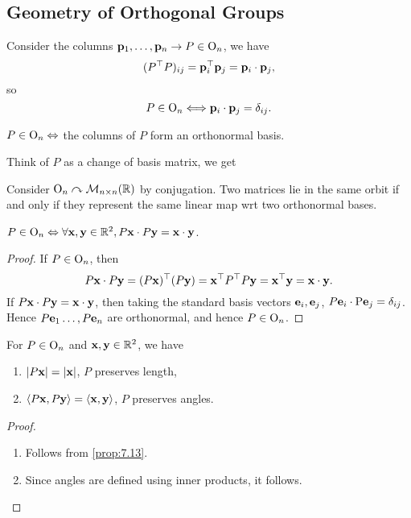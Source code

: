 \documentclass[10pt]{article}
\def\P{{\mathrm P}}
\begin{document}
    \subsection{Geometry of Orthogonal Groups}
    Consider the columns $ {\bf p}_1,\dots,{\bf p}_n\to P\in \mathrm{O}_n $, we have 
    \[
        (P^\top P)_{ij} = {\bf p}_i^\top{\bf p}_j = {\bf p}_i \cdot {\bf p}_j,
    \]
    so
    \[
        P\in \mathrm{O}_n \Longleftrightarrow {\bf p}_i \cdot {\bf p}_j = \delta_{ij}.
    \]
    \begin{proposition}\label{prop:7.11}
        $ P\in \mathrm{O}_n \Leftrightarrow  $ the columns of $P$ form an orthonormal basis.
    \end{proposition}
    Think of $P$ as a change of basis matrix, we get 
    \begin{proposition}\label{prop:7.12}
        Consider $ \mathrm{O}_n \curvearrowright \mathcal{M}_{n\times n}(\mathbb{R}) $ by conjugation. Two matrices lie in the same orbit if and only if they represent the same linear map wrt two orthonormal bases.
    \end{proposition}
    \begin{proposition}\label{prop:7.13}
        $ P\in \mathrm{O}_n \Leftrightarrow \forall {\bf x},{\bf y}\in \mathbb{R}^{2}, P{\bf x} \cdot P{\bf y} = {\bf x} \cdot {\bf y} $.
    \end{proposition}
    \begin{proof}
        If $ P\in \mathrm{O}_n $, then 
        \[
            P{\bf x} \cdot P{\bf y} = (P{\bf x})^\top(P{\bf y}) = {\bf x}^\top P^\top P {\bf y} = {\bf x}^\top {\bf y} = {\bf x} \cdot {\bf y}.
        \]
        If $P{\bf x} \cdot P{\bf y} = {\bf x} \cdot {\bf y}$, then taking the standard basis vectors ${\bf e}_i,{\bf e}_j$, $ P\bfe_i \cdot \P\bfe_j = \delta_{ij} $. Hence $ P{\bf e}_1 \dots, P{\bf e}_n $ are orthonormal, and hence $P\in \mathrm{O}_n$.
    \end{proof}
    \begin{corollary}\label{col:7.13}
        For $P\in \mathrm{O}_n$ and $ {\bf x},{\bf y}\in \mathbb{R}^{2} $, we have 
        \begin{enumerate}
            \item $ |P{\bf x}|=|{\bf x}| $, $P$ preserves length,
            \item $ \langle P{\bf x},P{\bf y} \rangle = \langle {\bf x},{\bf y} \rangle $, $P$ preserves angles.
        \end{enumerate}
    \end{corollary}
    \begin{proof}
        \begin{enumerate}
            \item Follows from \ref{prop:7.13}.
            \item Since angles are defined using inner products, it follows.
        \end{enumerate}
    \end{proof}
\end{document}
